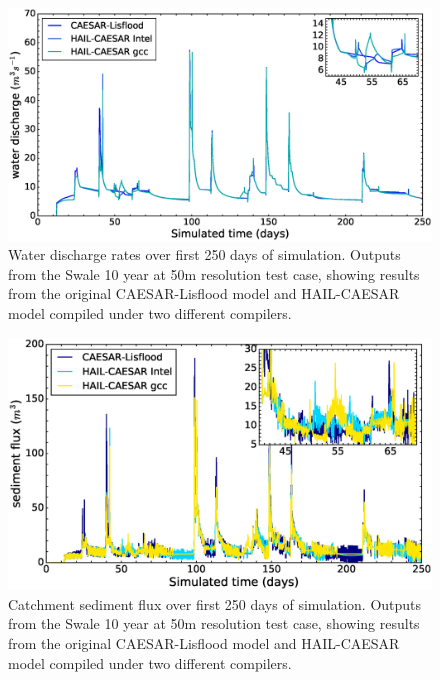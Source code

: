 \begin{figure}[t]
\includegraphics[width=12cm]{chp05_figures_scripts/lisflood_comparison.eps}
\caption{Water discharge rates over first 250 days of simulation. Outputs from the Swale 10 year at 50m resolution test case, showing results from the original CAESAR-Lisflood model and HAIL-CAESAR model compiled under two different compilers.}
\label{fig_swale_regression_lisflood}
\end{figure}

\begin{figure}[t]
\includegraphics[width=12cm]{chp05_figures_scripts/sed_tot_comparison.eps}
\caption{Catchment sediment flux over first 250 days of simulation. Outputs from the Swale 10 year at 50m resolution test case, showing results from the original CAESAR-Lisflood model and HAIL-CAESAR model compiled under two different compilers.}
\label{fig_swale_regression_sediment}
\end{figure}

